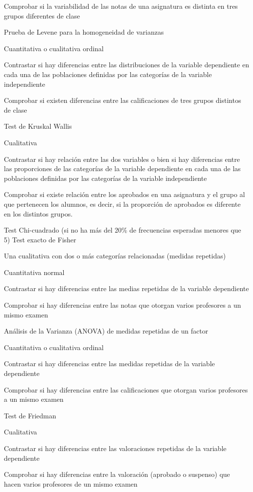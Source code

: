 \documentclass[
  a4paper,
]{scrreport}
\theoremstyle{definition}
\theoremstyle{definition}
\theoremstyle{remark}
\begin{document}
Comprobar si la variabilidad de las notas de una asignatura es distinta
en tres grupos diferentes de clase

Prueba de Levene para la homogeneidad de varianzas

Cuantitativa o cualitativa ordinal

Contrastar si hay diferencias entre las distribuciones de la variable
dependiente en cada una de las poblaciones definidas por las categorías
de la variable independiente

Comprobar si existen diferencias entre las calificaciones de tres grupos
distintos de clase

Test de Kruskal Wallis

Cualitativa

Contrastar si hay relación entre las dos variables o bien si hay
diferencias entre las proporciones de las categorías de la variable
dependiente en cada una de las poblaciones definidas por las categorías
de la variable independiente

Comprobar si existe relación entre los aprobados en una asignatura y el
grupo al que pertenecen los alumnos, es decir, si la proporción de
aprobados es diferente en los distintos grupos.

Test Chi-cuadrado (si no ha más del 20\% de frecuencias esperadas
menores que 5) Test exacto de Fisher

Una cualitativa con dos o más categorías relacionadas (medidas
repetidas)

Cuantitativa normal

Contrastar si hay diferencias entre las medias repetidas de la variable
dependiente

Comprobar si hay diferencias entre las notas que otorgan varios
profesores a un mismo examen

Análisis de la Varianza (ANOVA) de medidas repetidas de un factor

Cuantitativa o cualitativa ordinal

Contrastar si hay diferencias entre las medidas repetidas de la variable
dependiente

Comprobar si hay diferencias entre las calificaciones que otorgan varios
profesores a un mismo examen

Test de Friedman

Cualitativa

Contrastar si hay diferencias entre las valoraciones repetidas de la
variable dependiente

Comprobar si hay diferencias entre la valoración (aprobado o suspenso)
que hacen varios profesores de un mismo examen
\end{document}
